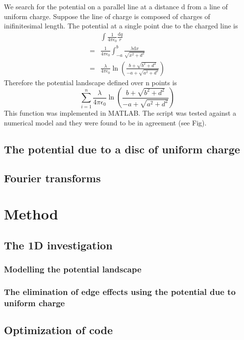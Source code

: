 \documentclass[]{article}
\begin{document}
We search for the potential on a parallel line at a distance d from a line of uniform charge. Suppose the line of charge is composed of charges of inifinitesimal length. The potential at a single point due to the charged line is
\begin{align}
& \int \frac{1}{4\pi\epsilon_0}\frac{\text{d}q}{r}\\
= & \frac{1}{4\pi\epsilon_0} \int_{-a}^{b}\frac{\lambda \text{d}x}{\sqrt{x^2+d^2}}\\
= & \frac{\lambda}{4\pi\epsilon_0} \ln \left(\frac{b+\sqrt{b^2+d^2}}{-a+\sqrt{a^2+d^2}}\right)
\end{align}
Therefore the potential landscape defined over n points is
\begin{equation}
\sum_{i=1}^n\frac{\lambda}{4\pi\epsilon_0} \ln \left(\frac{b+\sqrt{b^2+d^2}}{-a+\sqrt{a^2+d^2}}\right)
\end{equation}
This function was implemented in MATLAB. The script was tested against a numerical model and they were found to be in agreement (see Fig).

\subsection{The potential due to a disc of uniform charge}

\subsection{Fourier transforms}

\section{Method}

\subsection{The 1D investigation}

\subsubsection{Modelling the potential landscape}


\subsubsection{The elimination of edge effects using the potential due to uniform charge}

\subsection{Optimization of code}
\end{document}
